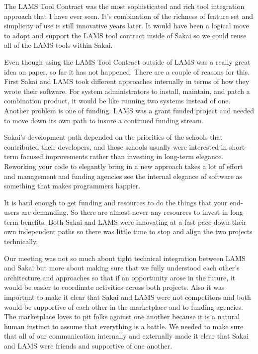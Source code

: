 \documentclass[12pt]{book}
\begin{document}
The LAMS Tool Contract was the most sophisticated
and rich tool integration approach that I have ever
seen.  It's combination of the richness of feature set
and simplicity of use is still innovative years later.
It would have been a logical move to adopt
and support the LAMS tool contract inside of Sakai
so we could reuse all of the LAMS tools
within Sakai.

Even though using the LAMS Tool Contract outside of LAMS
was a really great idea on paper, so far it has
not happened.   There are a couple of reasons for this.
First Sakai and LAMS took different approaches
internally in terms of how they wrote their software.
For system administrators to install, maintain, and patch
a combination product, it would be like running
two systems instead of one.  Another problem is one of
funding.  LAMS was a grant funded project and needed
to move down its own path to insure a continued funding stream.

Sakai's development path depended on the
priorities of the schools that contributed their developers,
and those schools usually were interested in short-term
focused improvements rather than investing in
long-term elegance.  Reworking your code to elegantly bring
in a new approach takes a lot of effort and management
and funding agencies see the internal elegance of software as
something that makes programmers happier.

It is hard enough to get funding and resources to do the
things that your end-users are demanding.  So there are
almost never any resources to invest in long-term benefits.
Both Sakai and LAMS were innovating at a fast pace down
their own independent paths so there was little time
to stop and align the two projects technically.

Our meeting was not so much about tight technical
integration between LAMS and Sakai but more about
making sure that we fully understood each
other's architecture and approaches so
that if an opportunity arose in the future, it would
be easier to coordinate activities across both projects.
Also it was important to make it clear that Sakai and LAMS
were not competitors and both would be supportive of each
other in the marketplace and to funding agencies.
The marketplace loves to pit folks against one another
because it is a natural human instinct to assume that
everything is a battle.  We needed to make sure that
all of our communication internally and externally
made it clear that Sakai and LAMS were friends
and supportive of one another.
\end{document}
